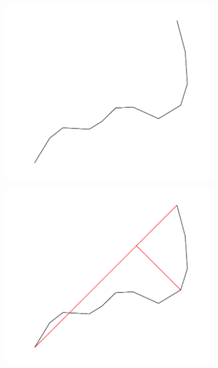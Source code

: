 \begin{figure}[h]
    \centering %
\begin{subfigure}{0.5\textwidth}
  \includegraphics[width=\linewidth]{./pictures/3/douglas-peucker_1.pdf}
  \label{fig:3-douglas-peucker_1}
\end{subfigure}\hfil %
\begin{subfigure}{0.5\textwidth}
  \includegraphics[width=\linewidth]{./pictures/3/douglas-peucker_2.pdf}
  \label{fig:3-douglas-peucker_2}
\end{subfigure}\hfil %

\end{figure}
